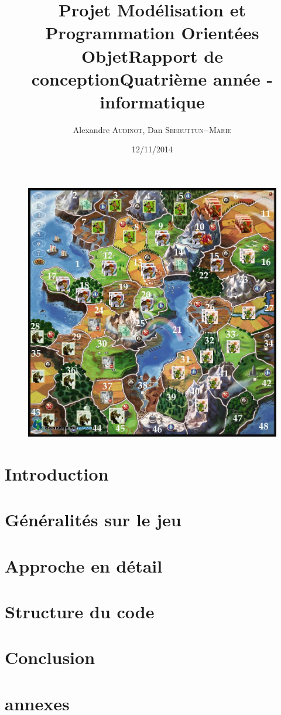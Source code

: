 \documentclass[12pt]{article}
\title{Projet Modélisation et Programmation Orientées Objet\smallbreak Rapport de conception\smallbreak Quatrième année - informatique }
\author{Alexandre \textsc{Audinot},  Dan \textsc{Seeruttun-{}-Marie}}
\date{12/11/2014}
\begin{document}
\maketitle

\begin{figure}[!h] 
\centerline{\includegraphics[scale=0.30]{img/cover.jpg}}
\end{figure}
\newpage

\newpage
\tableofcontents
\newpage
\newpage


\section{Introduction}

\newpage
\section{Généralités sur le jeu}

\newpage
\section{Approche en détail}

\newpage
\section{Structure du code}

\newpage
\section{Conclusion}

\section{annexes}

\end{document}
